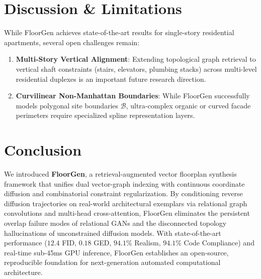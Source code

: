 \documentclass[journal]{IEEEtran}
\begin{document}
\section{Discussion \& Limitations}
While FloorGen achieves state-of-the-art results for single-story residential apartments, several open challenges remain:
\begin{enumerate}
    \item \textbf{Multi-Story Vertical Alignment}: Extending topological graph retrieval to vertical shaft constraints (stairs, elevators, plumbing stacks) across multi-level residential duplexes is an important future research direction.
    \item \textbf{Curvilinear Non-Manhattan Boundaries}: While FloorGen successfully models polygonal site boundaries $\mathcal{B}$, ultra-complex organic or curved facade perimeters require specialized spline representation layers.
\end{enumerate}

\section{Conclusion}
We introduced \textbf{FloorGen}, a retrieval-augmented vector floorplan synthesis framework that unifies dual vector-graph indexing with continuous coordinate diffusion and combinatorial constraint regularization. By conditioning reverse diffusion trajectories on real-world architectural exemplars via relational graph convolutions and multi-head cross-attention, FloorGen eliminates the persistent overlap failure modes of relational GANs and the disconnected topology hallucinations of unconstrained diffusion models. With state-of-the-art performance ($12.4$ FID, $0.18$ GED, $94.1\%$ Realism, $94.1\%$ Code Compliance) and real-time sub-45ms GPU inference, FloorGen establishes an open-source, reproducible foundation for next-generation automated computational architecture.



\end{document}
